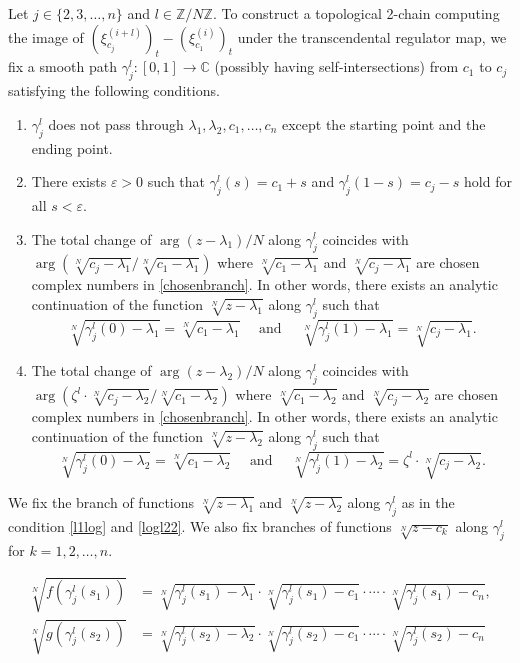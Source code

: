 \documentclass[10pt,a4paper]{amsart}
\newcommand{\C}{\mathbb{C}}
\newcommand{\Z}{\mathbb{Z}}
\renewcommand{\l}{\lambda}
\begin{document}
Let $j\in \{2,3,\dots,n\}$ and $l\in \Z/N\Z$.
To construct a topological 2-chain computing the image of $(\xi_{c_j}^{(i+l)})_t-(\xi_{c_1}^{(i)})_t$ under the transcendental regulator map, we fix a smooth path $\gamma_j^l\colon[0,1]\to \C$ (possibly having self-intersections) from $c_1$ to $c_j$ satisfying the following conditions.
\begin{enumerate}
\item\label{i} $\gamma_j^l$ does not pass through $\l_1,\l_2,c_1,\dots,c_n$ except the starting point and the ending point.
\item There exists $\varepsilon>0$ such that $\gamma_j^l(s) = c_1+s$ and $\gamma_j^l(1-s) = c_j - s$ hold for all $s<\varepsilon$.
\item\label{l1log} The total change of $\arg(z-\l_1)/N$ along $\gamma_j^l$ coincides with $\arg(\sqrt[N]{c_j-\l_1}/\sqrt[N]{c_1-\l_1})$ where $\sqrt[N]{c_1-\l_1}$ and $\sqrt[N]{c_j-\l_1}$ are chosen complex numbers in \eqref{chosenbranch}.
In other words, there exists an analytic continuation of the function $\sqrt[N]{z-\l_1}$ along $\gamma_j^l$ such that 
\begin{equation*}
\sqrt[N]{\gamma_j^l(0)-\l_1} = \sqrt[N]{c_1-\l_1}\quad \text{ and }\quad \sqrt[N]{\gamma_j^l(1)-\l_1}= \sqrt[N]{c_j-\l_1}.
\end{equation*}
\item\label{logl22} The total change of $\arg(z-\l_2)/N$ along $\gamma_j^l$ coincides with $\arg(\zeta^l\cdot\sqrt[N]{c_j-\l_2}/\sqrt[N]{c_1-\l_2})$ where $\sqrt[N]{c_1-\l_2}$ and $\sqrt[N]{c_j-\l_2}$ are chosen complex numbers in \eqref{chosenbranch}.
In other words, there exists an analytic continuation of the function $\sqrt[N]{z-\l_2}$ along $\gamma_j^l$ such that 
\begin{equation*}
\sqrt[N]{\gamma_j^l(0)-\l_2} = \sqrt[N]{c_1-\l_2}\quad \text{ and }\quad \sqrt[N]{\gamma_j^l(1)-\l_2}= \zeta^l\cdot \sqrt[N]{c_j-\l_2}.
\end{equation*}
\end{enumerate}
We fix the branch of functions $\sqrt[N]{z-\l_1}$ and $\sqrt[N]{z-\l_2}$ along $\gamma_j^l$ as in the condition \ref{l1log} and \ref{logl22}.
We also fix branches of functions $\sqrt[N]{z-c_k}$ along $\gamma_j^l$ for $k=1,2,\dots, n$.

\begin{equation}\label{branchsqrt}
\begin{aligned}
\sqrt[N]{f(\gamma_j^l(s_1))} & = \sqrt[N]{\gamma_j^l(s_1)-\l_1}\cdot\sqrt[N]{\gamma_j^l(s_1)-c_1} \cdot \cdots \cdot \sqrt[N]{\gamma_j^l(s_1)-c_n}, \\
\sqrt[N]{g(\gamma_j^l(s_2))} &= \sqrt[N]{\gamma_j^l(s_2)-\l_2}\cdot\sqrt[N]{\gamma_j^l(s_2)-c_1} \cdot \cdots \cdot \sqrt[N]{\gamma_j^l(s_2)-c_n}
\end{aligned}
\end{equation}
\end{document}
